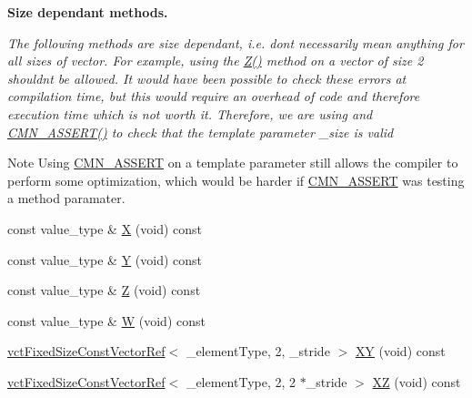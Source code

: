 \begin{Indent}{\bf Size dependant methods.}\par
{\em The following methods are size dependant, i.\+e. don\textquotesingle{}t necessarily mean anything for all sizes of vector. For example, using the \hyperlink{classvct_fixed_size_const_vector_base_a7512e09f861dd14a4953184ba21bea65}{Z()} method on a vector of size 2 shouldn\textquotesingle{}t be allowed. It would have been possible to check these errors at compilation time, but this would require an overhead of code and therefore execution time which is not worth it. Therefore, we are using and \hyperlink{group__cisst_common_ga6a12b7031ea38ac5bf5937b8633c97ff}{C\+M\+N\+\_\+\+A\+S\+S\+E\+R\+T()} to check that the template parameter \+\_\+size is valid

\begin{DoxyNote}{Note}
Using \hyperlink{group__cisst_common_ga6a12b7031ea38ac5bf5937b8633c97ff}{C\+M\+N\+\_\+\+A\+S\+S\+E\+R\+T} on a template parameter still allows the compiler to perform some optimization, which would be harder if \hyperlink{group__cisst_common_ga6a12b7031ea38ac5bf5937b8633c97ff}{C\+M\+N\+\_\+\+A\+S\+S\+E\+R\+T} was testing a method paramater. 
\end{DoxyNote}
}\begin{DoxyCompactItemize}
\item 
const value\+\_\+type \& \hyperlink{classvct_fixed_size_const_vector_base_ab4c73c8ed62e07d70b60f176fec6a6a4}{X} (void) const 
\item 
const value\+\_\+type \& \hyperlink{classvct_fixed_size_const_vector_base_acd49ac5b86c51004025038feaee9b207}{Y} (void) const 
\item 
const value\+\_\+type \& \hyperlink{classvct_fixed_size_const_vector_base_a7512e09f861dd14a4953184ba21bea65}{Z} (void) const 
\item 
const value\+\_\+type \& \hyperlink{classvct_fixed_size_const_vector_base_a9159e8044eaf25afd14bf29b4896cb2e}{W} (void) const 
\item 
\hyperlink{classvct_fixed_size_const_vector_ref}{vct\+Fixed\+Size\+Const\+Vector\+Ref}$<$ \+\_\+element\+Type, 2, \+\_\+stride $>$ \hyperlink{classvct_fixed_size_const_vector_base_a37dd8ddaeed8782eba28c4ed33df976c}{X\+Y} (void) const 
\item 
\hyperlink{classvct_fixed_size_const_vector_ref}{vct\+Fixed\+Size\+Const\+Vector\+Ref}$<$ \+\_\+element\+Type, 2, 2 $\ast$\+\_\+stride $>$ \hyperlink{classvct_fixed_size_const_vector_base_abfc16233497e3ad6111483a8ec40a317}{X\+Z} (void) const 

\end{DoxyCompactItemize}
\end{Indent}

